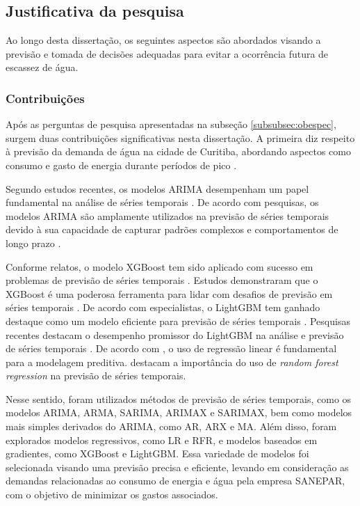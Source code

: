 \subsection{Justificativa da pesquisa} \label{subsec:justif}

Ao longo desta dissertação, os seguintes aspectos são abordados visando a previsão e tomada de decisões adequadas para evitar a ocorrência futura de escassez de água.

\subsubsection{Contribui\c c\~oes} \label{subsubsec:Contribuição}

Após as perguntas de pesquisa apresentadas na subseção \ref{subsubsec:obespec}, surgem duas contribuições significativas nesta dissertação. A primeira diz respeito à previsão da demanda de água na cidade de Curitiba, abordando aspectos como consumo e gasto de energia durante períodos de pico .

Segundo estudos recentes, os modelos ARIMA desempenham um papel fundamental na análise de séries temporais . De acordo com pesquisas, os modelos ARIMA são amplamente utilizados na previsão de séries temporais devido à sua capacidade de capturar padrões complexos e comportamentos de longo prazo .

Conforme relatos, o modelo XGBoost tem sido aplicado com sucesso em problemas de previsão de séries temporais . Estudos demonstraram que o XGBoost é uma poderosa ferramenta para lidar com desafios de previsão em séries temporais . De acordo com especialistas, o LightGBM tem ganhado destaque como um modelo eficiente para previsão de séries temporais . Pesquisas recentes destacam o desempenho promissor do LightGBM na análise e previsão de séries temporais . De acordo com , o uso de regressão linear é fundamental para a modelagem preditiva.  destacam a importância do uso de \textit{random forest regression} na previsão de séries temporais.

Nesse sentido, foram utilizados métodos de previsão de séries temporais, como os modelos ARIMA, ARMA, SARIMA, ARIMAX e SARIMAX, bem como modelos mais simples derivados do ARIMA, como AR, ARX e MA. Além disso, foram explorados modelos regressivos, como LR e RFR, e modelos baseados em gradientes, como XGBoost e LightGBM. Essa variedade de modelos foi selecionada visando uma previsão precisa e eficiente, levando em consideração as demandas relacionadas ao consumo de energia e água pela empresa SANEPAR, com o objetivo de minimizar os gastos associados.

